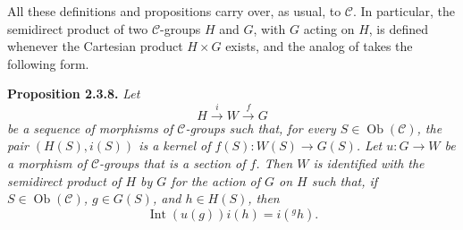 All these definitions and propositions carry over, as usual, to
\(\mathscr C\). In particular, the semidirect product of two
\(\mathscr C\)-groups \(H\) and \(G\), with \(G\) acting on \(H\), is
defined whenever the Cartesian product \(H\times G\) exists, and the
analog of  takes the following form.

\medskip
\noindent{}\textbf{Proposition 2.3.8.}
\textit{Let
\[
  H\xrightarrow{i}W\xrightarrow{f}G
\]
be a sequence of morphisms of \(\mathscr C\)-groups such that, for every
\(S\in\operatorname{Ob}(\mathscr C)\), the pair \((H(S),i(S))\) is a
kernel of \(f(S):W(S)\to G(S)\). Let \(u:G\to W\) be a morphism of
\(\mathscr C\)-groups that is a section of \(f\). Then \(W\) is
identified with the semidirect product of \(H\) by \(G\) for the action
of \(G\) on \(H\) such that, if \(S\in\operatorname{Ob}(\mathscr C)\),
\(g\in G(S)\), and \(h\in H(S)\), then
\[
  \operatorname{Int}(u(g))i(h)=i({}^{g}h).
\]}
